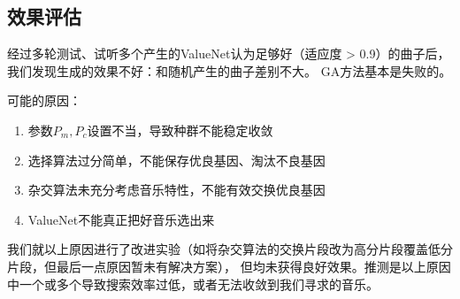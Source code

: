 \documentclass{ctexart}
\begin{document}
\subsection{效果评估}
经过多轮测试、试听多个产生的ValueNet认为足够好（适应度 > 0.9）的曲子后，我们发现生成的效果不好：和随机产生的曲子差别不大。
GA方法基本是失败的。

可能的原因：
\begin{enumerate}[nosep]
  \item 参数$P_m,P_c$设置不当，导致种群不能稳定收敛
  \item 选择算法过分简单，不能保存优良基因、淘汰不良基因
  \item 杂交算法未充分考虑音乐特性，不能有效交换优良基因
  \item ValueNet不能真正把好音乐选出来
\end{enumerate}

我们就以上原因进行了改进实验（如将杂交算法的交换片段改为高分片段覆盖低分片段，但最后一点原因暂未有解决方案），
但均未获得良好效果。推测是以上原因中一个或多个导致搜索效率过低，或者无法收敛到我们寻求的音乐。
\end{document}
